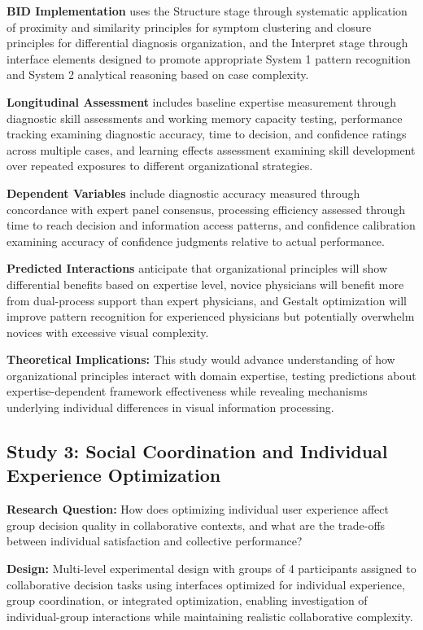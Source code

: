 \documentclass[
  authoryear,
  preprint]{elsarticle}
\begin{document}
\textbf{BID Implementation} uses the Structure stage through systematic
application of proximity and similarity principles for symptom
clustering and closure principles for differential diagnosis
organization, and the Interpret stage through interface elements
designed to promote appropriate System 1 pattern recognition and System
2 analytical reasoning based on case complexity.

\textbf{Longitudinal Assessment} includes baseline expertise measurement
through diagnostic skill assessments and working memory capacity
testing, performance tracking examining diagnostic accuracy, time to
decision, and confidence ratings across multiple cases, and learning
effects assessment examining skill development over repeated exposures
to different organizational strategies.

\textbf{Dependent Variables} include diagnostic accuracy measured
through concordance with expert panel consensus, processing efficiency
assessed through time to reach decision and information access patterns,
and confidence calibration examining accuracy of confidence judgments
relative to actual performance.

\textbf{Predicted Interactions} anticipate that organizational
principles will show differential benefits based on expertise level,
novice physicians will benefit more from dual-process support than
expert physicians, and Gestalt optimization will improve pattern
recognition for experienced physicians but potentially overwhelm novices
with excessive visual complexity.

\textbf{Theoretical Implications:} This study would advance
understanding of how organizational principles interact with domain
expertise, testing predictions about expertise-dependent framework
effectiveness while revealing mechanisms underlying individual
differences in visual information processing.

\subsection{Study 3: Social Coordination and Individual Experience
Optimization}\label{study-3-social-coordination-and-individual-experience-optimization}

\textbf{Research Question:} How does optimizing individual user
experience affect group decision quality in collaborative contexts, and
what are the trade-offs between individual satisfaction and collective
performance?

\textbf{Design:} Multi-level experimental design with groups of 4
participants assigned to collaborative decision tasks using interfaces
optimized for individual experience, group coordination, or integrated
optimization, enabling investigation of individual-group interactions
while maintaining realistic collaborative complexity.
\end{document}
